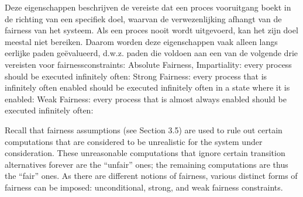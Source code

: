 \documentclass{article}
\begin{document}
	
	Deze eigenschappen beschrijven de vereiste dat een proces vooruitgang boekt in de richting van een specifiek doel, waarvan de verwezenlijking afhangt van de fairness van het systeem. Als een proces nooit wordt uitgevoerd, kan het zijn doel meestal niet bereiken. Daarom worden deze eigenschappen vaak alleen langs eerlijke paden geëvalueerd, d.w.z. paden die voldoen aan een van de volgende drie vereisten voor fairnessconstraints:
	Absolute Fairness, Impartiality: every process should be executed infinitely often:
	Strong Fairness: every process that is infinitely often enabled should be executed infinitely often in
	a state where it is enabled:
	Weak Fairness: every process that is almost always enabled should be executed infinitely often:
	
	Recall that fairness assumptions (see Section 3.5) are used to rule out certain computations
	that are considered to be unrealistic for the system under consideration. These unreasonable
	computations that ignore certain transition alternatives forever are the “unfair” ones;
	the remaining computations are thus the “fair” ones. As there are different notions of fairness,
	various distinct forms of fairness can be imposed: unconditional, strong, and weak
	fairness constraints.
	
\end{document}
